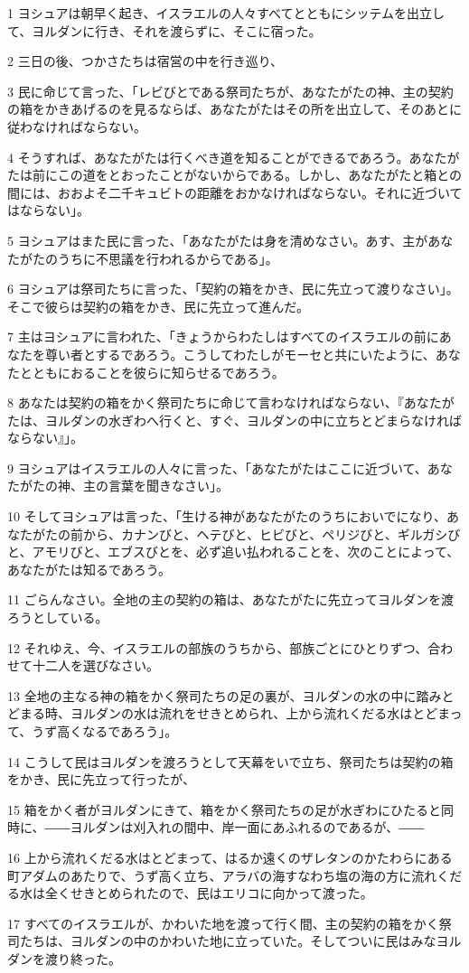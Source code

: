 \par 1 ヨシュアは朝早く起き、イスラエルの人々すべてとともにシッテムを出立して、ヨルダンに行き、それを渡らずに、そこに宿った。
\par 2 三日の後、つかさたちは宿営の中を行き巡り、
\par 3 民に命じて言った、「レビびとである祭司たちが、あなたがたの神、主の契約の箱をかきあげるのを見るならば、あなたがたはその所を出立して、そのあとに従わなければならない。
\par 4 そうすれば、あなたがたは行くべき道を知ることができるであろう。あなたがたは前にこの道をとおったことがないからである。しかし、あなたがたと箱との間には、おおよそ二千キュビトの距離をおかなければならない。それに近づいてはならない」。
\par 5 ヨシュアはまた民に言った、「あなたがたは身を清めなさい。あす、主があなたがたのうちに不思議を行われるからである」。
\par 6 ヨシュアは祭司たちに言った、「契約の箱をかき、民に先立って渡りなさい」。そこで彼らは契約の箱をかき、民に先立って進んだ。
\par 7 主はヨシュアに言われた、「きょうからわたしはすべてのイスラエルの前にあなたを尊い者とするであろう。こうしてわたしがモーセと共にいたように、あなたとともにおることを彼らに知らせるであろう。
\par 8 あなたは契約の箱をかく祭司たちに命じて言わなければならない、『あなたがたは、ヨルダンの水ぎわへ行くと、すぐ、ヨルダンの中に立ちとどまらなければならない』」。
\par 9 ヨシュアはイスラエルの人々に言った、「あなたがたはここに近づいて、あなたがたの神、主の言葉を聞きなさい」。
\par 10 そしてヨシュアは言った、「生ける神があなたがたのうちにおいでになり、あなたがたの前から、カナンびと、ヘテびと、ヒビびと、ペリジびと、ギルガシびと、アモリびと、エブスびとを、必ず追い払われることを、次のことによって、あなたがたは知るであろう。
\par 11 ごらんなさい。全地の主の契約の箱は、あなたがたに先立ってヨルダンを渡ろうとしている。
\par 12 それゆえ、今、イスラエルの部族のうちから、部族ごとにひとりずつ、合わせて十二人を選びなさい。
\par 13 全地の主なる神の箱をかく祭司たちの足の裏が、ヨルダンの水の中に踏みとどまる時、ヨルダンの水は流れをせきとめられ、上から流れくだる水はとどまって、うず高くなるであろう」。
\par 14 こうして民はヨルダンを渡ろうとして天幕をいで立ち、祭司たちは契約の箱をかき、民に先立って行ったが、
\par 15 箱をかく者がヨルダンにきて、箱をかく祭司たちの足が水ぎわにひたると同時に、――ヨルダンは刈入れの間中、岸一面にあふれるのであるが、――
\par 16 上から流れくだる水はとどまって、はるか遠くのザレタンのかたわらにある町アダムのあたりで、うず高く立ち、アラバの海すなわち塩の海の方に流れくだる水は全くせきとめられたので、民はエリコに向かって渡った。
\par 17 すべてのイスラエルが、かわいた地を渡って行く間、主の契約の箱をかく祭司たちは、ヨルダンの中のかわいた地に立っていた。そしてついに民はみなヨルダンを渡り終った。

